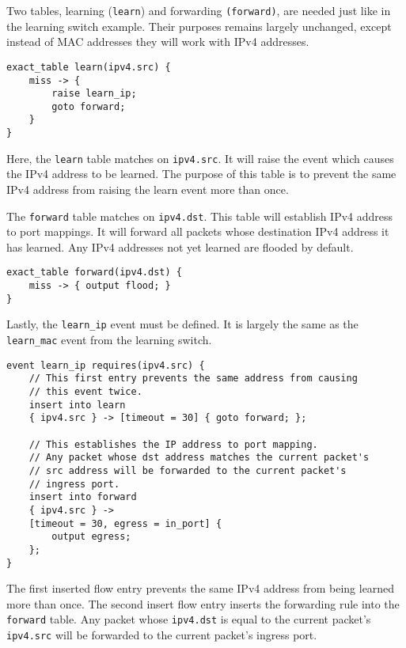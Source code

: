 Two tables, learning (\texttt{learn}) and forwarding \texttt{(forward)},
are needed just like in the learning switch example. Their purposes
remains largely unchanged, except instead of MAC addresses they
will work with IPv4 addresses.

\begin{codepage}
\begin{lstlisting}
exact_table learn(ipv4.src) {
	miss -> {
		raise learn_ip;
		goto forward;
	}
}
\end{lstlisting}
\end{codepage}

Here, the \texttt{learn} table matches on \texttt{ipv4.src}. 
It will raise the event which causes the IPv4 address to be learned. 
The purpose of this table is to prevent the same IPv4 address from
raising the learn event more than once.

The \texttt{forward} table matches on \texttt{ipv4.dst}. This table will establish IPv4
address to port mappings. It will forward all packets whose destination IPv4
address it has learned. Any IPv4 addresses not yet learned are flooded by
default.

\begin{codepage}
\begin{lstlisting}
exact_table forward(ipv4.dst) {
	miss -> { output flood; }
}
\end{lstlisting}
\end{codepage}

Lastly, the \texttt{learn\_ip} event must be defined. It is
largely the same as the \texttt{learn\_mac} event from the learning switch.

\begin{codepage}
\begin{lstlisting}
event learn_ip requires(ipv4.src) {
	// This first entry prevents the same address from causing
	// this event twice.
	insert into learn
	{ ipv4.src } -> [timeout = 30] { goto forward; };

	// This establishes the IP address to port mapping.
	// Any packet whose dst address matches the current packet's
	// src address will be forwarded to the current packet's
	// ingress port.
	insert into forward
	{ ipv4.src } ->
	[timeout = 30, egress = in_port] {
		output egress;
	};
}
\end{lstlisting}
\end{codepage}

The first inserted flow entry prevents the same IPv4 address from being learned
more than once. The second insert flow entry inserts the forwarding rule into the
\texttt{forward} table. Any packet whose \texttt{ipv4.dst} is equal to the current
packet's \texttt{ipv4.src} will be forwarded to the current packet's ingress
port.

